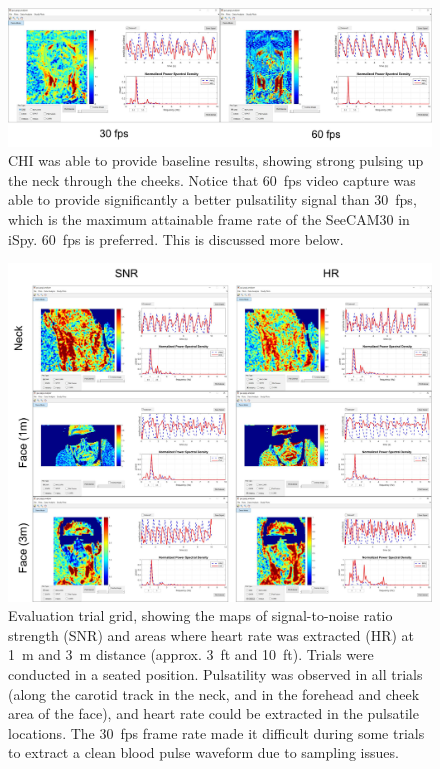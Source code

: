 \documentclass{article}
\begin{document}
\begin{figure}[H]
\centering
\includegraphics[width=\textwidth]{chi}
\caption{CHI was able to provide baseline results, showing strong pulsing up the neck through the cheeks. Notice that 60~fps video capture was able to provide significantly a better pulsatility signal than 30~fps, which is the maximum attainable frame rate of the SeeCAM30 in iSpy. 60~fps is preferred. This is discussed more below.}
\end{figure}

\begin{figure}[H]
\centering
\includegraphics[width=\textwidth]{trials}
\caption{Evaluation trial grid, showing the maps of signal-to-noise ratio strength (SNR) and areas where heart rate was extracted (HR) at 1~m and 3~m distance (approx. 3~ft and 10~ft). Trials were conducted in a seated position. Pulsatility was observed in all trials (along the carotid track in the neck, and in the forehead and cheek area of the face), and heart rate could be extracted in the pulsatile locations. The 30~fps frame rate made it difficult during some trials to extract a clean blood pulse waveform due to sampling issues.}
\end{figure}
\end{document}
